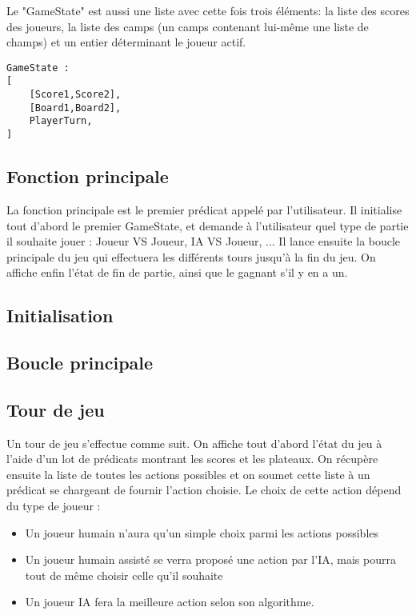 \documentclass[]{article}
\begin{document}
Le "GameState" est aussi une liste avec cette fois trois éléments: la liste des scores des joueurs, la liste des camps (un camps contenant lui-même une liste de champs) et un entier déterminant le joueur actif.
\begin{verbatim}
GameState :
[
	[Score1,Score2],
	[Board1,Board2],
	PlayerTurn, 
]
\end{verbatim}

\subsection{Fonction principale}

La fonction principale est le premier prédicat appelé par l'utilisateur. Il initialise tout d'abord le premier GameState, et demande à l'utilisateur quel type de partie il souhaite jouer : Joueur VS Joueur, IA VS Joueur, ... Il lance ensuite la boucle principale du jeu qui effectuera les différents tours jusqu'à la fin du jeu. On affiche enfin l'état de fin de partie, ainsi que le gagnant s'il y en a un.

\subsection{Initialisation}

\subsection{Boucle principale}

\subsection{Tour de jeu}

Un tour de jeu s'effectue comme suit. On affiche tout d'abord l'état du jeu à l'aide d'un lot de prédicats montrant les scores et les plateaux. On récupère ensuite la liste de toutes les actions possibles et on soumet cette liste à un prédicat se chargeant de fournir l'action choisie. Le choix de cette action dépend du type de joueur : 
\begin{itemize}
\item Un joueur humain n'aura qu'un simple choix parmi les actions possibles
\item Un joueur humain assisté se verra proposé une action par l'IA, mais pourra tout de même choisir celle qu'il souhaite
\item Un joueur IA fera la meilleure action selon son algorithme.
\end{itemize}
\end{document}

